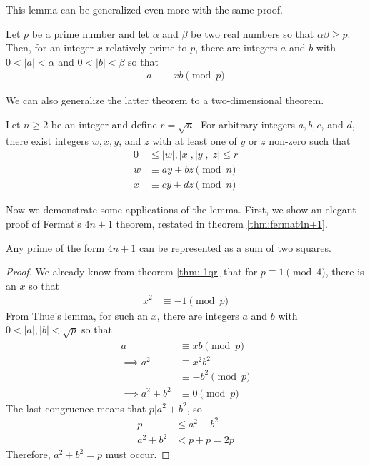 This lemma can be generalized even more with the same proof.
\begin{theorem}
	Let $p$ be a prime number and let $\alpha$ and $\beta$ be two real numbers so that $\alpha\beta \geq p$. Then, for an integer $x$ relatively prime to $p$, there are integers $a$ and $b$ with $0<|a|<\alpha$ and $0<|b|<\beta $ so that
	\begin{align*}
		a & \equiv xb\pmod p
	\end{align*}
\end{theorem}
We can also generalize the latter theorem to a two-dimensional theorem.
\begin{theorem}
	Let $n\geq2$ be an integer and define $r=\sqrt{n}$. For arbitrary integers $a,b,c$, and $d$, there exist integers $w,x,y$, and $z$ with at least one of $y$ or $z$ non-zero such that
	\begin{align*}
		0& \leq |w|,|x|,|y|,|z|\leq r\\
		w&\equiv ay+bz\pmod n\\
		x&\equiv cy+dz\pmod n
	\end{align*}
\end{theorem}


Now we demonstrate some applications of the lemma. First, we show an elegant proof of Fermat's $4n+1$ theorem, restated in theorem \autoref{thm:fermat4n+1}.

\begin{theorem}\label{thm:fermat4n+1}
	Any prime of the form $4n+1$ can be represented as a sum of two squares.
\end{theorem}

\begin{proof}
	We already know from theorem \autoref{thm:-1qr} that for $p\equiv1\pmod4$, there is an $x$ so that
	\begin{align*}
		x^2 & \equiv-1\pmod p
	\end{align*}
	From Thue's lemma, for such an $x$, there are integers $a$ and $b$ with $0<|a|,|b|<\sqrt{p}$ so that
	\begin{align*}
		a
			& \equiv xb \pmod p\\
		\implies a^2
			& \equiv x^2b^2\\
			& \equiv -b^2\pmod p\\
		\implies a^2+b^2
			& \equiv 0 \pmod p
	\end{align*}
	The last congruence means that $p|a^2+b^2$, so
	\begin{align*}
		p   &\leq a^2+b^2\\
		a^2+b^2	&< p+p = 2p
	\end{align*}
	Therefore, $a^2+b^2=p$ must occur.
\end{proof}

